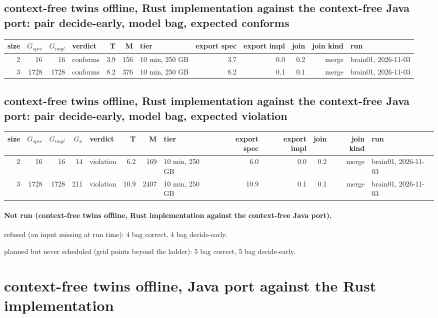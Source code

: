 \documentclass[10pt]{article}
\begin{document}
\subsection*{context-free twins offline, Rust implementation against the context-free Java port: pair \textsf{decide-early}, model bag, expected conforms}
\begin{longtable}{@{}rrrlrrlrrrrl@{}}
\toprule
size & $G_{\mathit{spec}}$ & $G_{\mathit{impl}}$ & verdict & T & M & tier & export spec & export impl & join & join kind & run \\
\midrule
\endhead
\color{blue} 2 & 16 & 16 & conforms & 3.9 & 156 & 10 min, 250 GB & 3.7 & 0.0 & 0.2 & merge & brain01, 2026-11-03 \\
\color{blue} 3 & 1728 & 1728 & conforms & 8.2 & 376 & 10 min, 250 GB & 8.2 & 0.1 & 0.1 & merge & brain01, 2026-11-03 \\
\bottomrule
\end{longtable}
\subsection*{context-free twins offline, Rust implementation against the context-free Java port: pair \textsf{decide-early}, model bag, expected violation}
\begin{longtable}{@{}rrrrlrrlrrrrl@{}}
\toprule
size & $G_{\mathit{spec}}$ & $G_{\mathit{impl}}$ & $G_x$ & verdict & T & M & tier & export spec & export impl & join & join kind & run \\
\midrule
\endhead
\color{blue} 2 & 16 & 16 & 14 & violation & 6.2 & 169 & 10 min, 250 GB & 6.0 & 0.0 & 0.2 & merge & brain01, 2026-11-03 \\
\color{blue} 3 & 1728 & 1728 & 211 & violation & 10.9 & 2407 & 10 min, 250 GB & 10.9 & 0.1 & 0.1 & merge & brain01, 2026-11-03 \\
\bottomrule
\end{longtable}
\paragraph{Not run (context-free twins offline, Rust implementation against the context-free Java port).}
refused (an input missing at run time): 4 bag correct, 4 bag decide-early.\par
planned but never scheduled (grid points beyond the ladder): 5 bag correct, 5 bag decide-early.\par
\section*{context-free twins offline, Java port against the Rust implementation}
\end{document}
